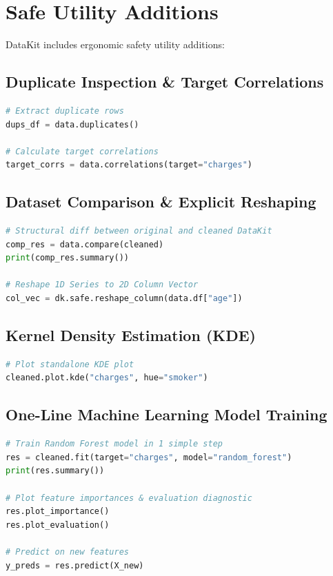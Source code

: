 \documentclass[11pt,a4paper,oneside]{book}
\begin{document}
\chapter{Safe Utility Additions}

DataKit includes ergonomic safety utility additions:

\section{Duplicate Inspection \& Target Correlations}
\begin{lstlisting}[language=python]
# Extract duplicate rows
dups_df = data.duplicates()

# Calculate target correlations
target_corrs = data.correlations(target="charges")
\end{lstlisting}

\section{Dataset Comparison \& Explicit Reshaping}
\begin{lstlisting}[language=python]
# Structural diff between original and cleaned DataKit
comp_res = data.compare(cleaned)
print(comp_res.summary())

# Reshape 1D Series to 2D Column Vector
col_vec = dk.safe.reshape_column(data.df["age"])
\end{lstlisting}

\section{Kernel Density Estimation (KDE)}
\begin{lstlisting}[language=python]
# Plot standalone KDE plot
cleaned.plot.kde("charges", hue="smoker")
\end{lstlisting}

\section{One-Line Machine Learning Model Training}
\begin{lstlisting}[language=python]
# Train Random Forest model in 1 simple step
res = cleaned.fit(target="charges", model="random_forest")
print(res.summary())

# Plot feature importances & evaluation diagnostic
res.plot_importance()
res.plot_evaluation()

# Predict on new features
y_preds = res.predict(X_new)
\end{lstlisting}
\end{document}
